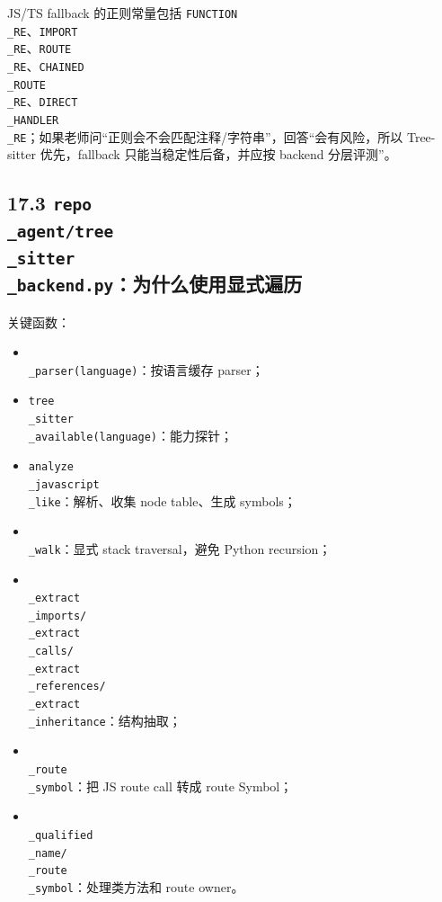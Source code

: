 \documentclass[UTF8,12pt,openany]{ctexbook}
\begin{document}
JS/TS fallback 的正则常量包括 \texttt{FUNCTION\\_RE}、\texttt{IMPORT\\_RE}、\texttt{ROUTE\\_RE}、\texttt{CHAINED\\_ROUTE\\_RE}、\texttt{DIRECT\\_HANDLER\\_RE}；如果老师问“正则会不会匹配注释/字符串”，回答“会有风险，所以 Tree-sitter 优先，fallback 只能当稳定性后备，并应按 backend 分层评测”。\par

\subsection{17.3 \texttt{repo\\_agent/tree\\_sitter\\_backend.py}：为什么使用显式遍历}

关键函数：\par

\begin{itemize}
\item \texttt{\\_parser(language)}：按语言缓存 parser；
\item \texttt{tree\\_sitter\\_available(language)}：能力探针；
\item \texttt{analyze\\_javascript\\_like}：解析、收集 node table、生成 symbols；
\item \texttt{\\_walk}：显式 stack traversal，避免 Python recursion；
\item \texttt{\\_extract\\_imports/\\_extract\\_calls/\\_extract\\_references/\\_extract\\_inheritance}：结构抽取；
\item \texttt{\\_route\\_symbol}：把 JS route call 转成 route Symbol；
\item \texttt{\\_qualified\\_name/\\_route\\_symbol}：处理类方法和 route owner。
\end{itemize}
\end{document}
